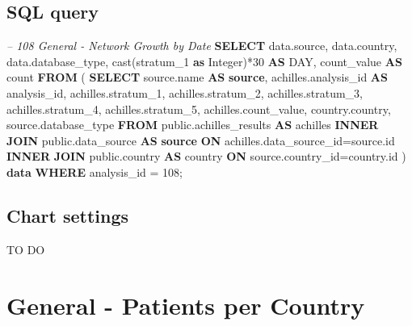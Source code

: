 \documentclass[]{book}
\newenvironment{Shaded}{\begin{snugshade}}{\end{snugshade}}
\newcommand{\KeywordTok}[1]{\textcolor[rgb]{0.13,0.29,0.53}{\textbf{#1}}}
\newcommand{\DataTypeTok}[1]{\textcolor[rgb]{0.13,0.29,0.53}{#1}}
\newcommand{\DecValTok}[1]{\textcolor[rgb]{0.00,0.00,0.81}{#1}}
\newcommand{\CommentTok}[1]{\textcolor[rgb]{0.56,0.35,0.01}{\textit{#1}}}
\newcommand{\FunctionTok}[1]{\textcolor[rgb]{0.00,0.00,0.00}{#1}}
\newcommand{\NormalTok}[1]{#1}
\begin{document}
\subsection{SQL query}\label{sql-query-4}

\begin{Shaded}
\begin{Highlighting}[]
\CommentTok{-- 108    General - Network Growth by Date}
\KeywordTok{SELECT}\NormalTok{ data.source,}
\NormalTok{       data.country,}
\NormalTok{       data.database_type,}
       \FunctionTok{cast}\NormalTok{(stratum_1 }\KeywordTok{as} \DataTypeTok{Integer}\NormalTok{)*}\DecValTok{30} \KeywordTok{AS} \DataTypeTok{DAY}\NormalTok{,}
\NormalTok{       count_value                   }\KeywordTok{AS} \FunctionTok{count}
\KeywordTok{FROM}\NormalTok{ (}
     \KeywordTok{SELECT}\NormalTok{ source.name              }\KeywordTok{AS} \KeywordTok{source}\NormalTok{,}
\NormalTok{            achilles.analysis_id     }\KeywordTok{AS}\NormalTok{ analysis_id,}
\NormalTok{            achilles.stratum_1,}
\NormalTok{            achilles.stratum_2,}
\NormalTok{            achilles.stratum_3,}
\NormalTok{            achilles.stratum_4,}
\NormalTok{            achilles.stratum_5,}
\NormalTok{            achilles.count_value,}
\NormalTok{            country.country,}
\NormalTok{            source.database_type}
     \KeywordTok{FROM}\NormalTok{ public.achilles_results }\KeywordTok{AS}\NormalTok{ achilles }\KeywordTok{INNER} \KeywordTok{JOIN} 
\NormalTok{      public.data_source }\KeywordTok{AS} \KeywordTok{source} \KeywordTok{ON} 
\NormalTok{      achilles.data_source_id=source.id}
     \KeywordTok{INNER} \KeywordTok{JOIN}\NormalTok{ public.country }\KeywordTok{AS}\NormalTok{ country }\KeywordTok{ON} 
\NormalTok{      source.country_id=country.id}
\NormalTok{     ) }\KeywordTok{data}
\KeywordTok{WHERE}\NormalTok{ analysis_id = }\DecValTok{108}\NormalTok{;}
\end{Highlighting}
\end{Shaded}

\subsection{Chart settings}\label{chart-settings-4}

TO DO

\section{General - Patients per
Country}\label{general---patients-per-country}
\end{document}
